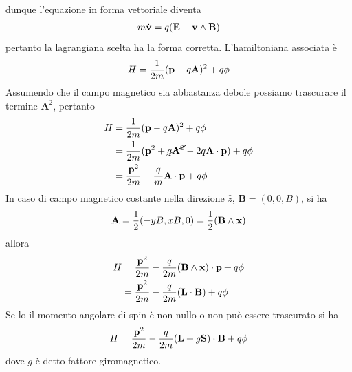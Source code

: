 \documentclass{article}
\begin{document}
dunque l'equazione in forma vettoriale diventa
\begin{gather}
    m\dot{\mathbf{v}} = q(\mathbf{E} + \mathbf{v} \wedge \mathbf{B}) \notag
\end{gather}
pertanto la lagrangiana scelta ha la forma corretta. L'hamiltoniana associata è
\begin{gather}
    H = \frac{1}{2m}(\mathbf{p} - q\mathbf{A})^2 + q\phi \notag
\end{gather}
Assumendo che il campo magnetico sia abbastanza debole possiamo trascurare il termine $\mathbf{A}^2$, pertanto
\begin{align}
    H &= \frac{1}{2m}(\mathbf{p} - q\mathbf{A})^2 + q\phi \notag \\
    &= \frac{1}{2m}(\mathbf{p}^2 + \cancel{q\mathbf{A}^2} -2q\mathbf{A} \cdot \mathbf{p}) + q\phi \notag \\
    &= \frac{\mathbf{p}^2}{2m} - \frac{q}{m}\mathbf{A} \cdot \mathbf{p} + q\phi \notag
\end{align}
In caso di campo magnetico costante nella direzione $\hat{z}$, $\mathbf{B} = (0, 0, B)$, si ha
\begin{gather}
    \mathbf{A} = \frac{1}{2}(-yB, xB, 0) = \frac{1}{2}(\mathbf{B} \wedge \mathbf{x}) \notag
\end{gather}
allora
\begin{align}
    H &= \frac{\mathbf{p}^2}{2m} - \frac{q}{2m}(\mathbf{B} \wedge \mathbf{x}) \cdot \mathbf{p} + q\phi \notag \\
    &= \frac{\mathbf{p}^2}{2m} - \frac{q}{2m}(\mathbf{L} \cdot \mathbf{B}) + q\phi \notag
\end{align}
Se lo il momento angolare di spin è non nullo o non può essere trascurato si ha
\begin{gather}
    H = \frac{\mathbf{p}^2}{2m} - \frac{q}{2m}(\mathbf{L} + g\mathbf{S}) \cdot \mathbf{B} + q\phi \notag
\end{gather}
dove $g$ è detto fattore giromagnetico.
\end{document}
